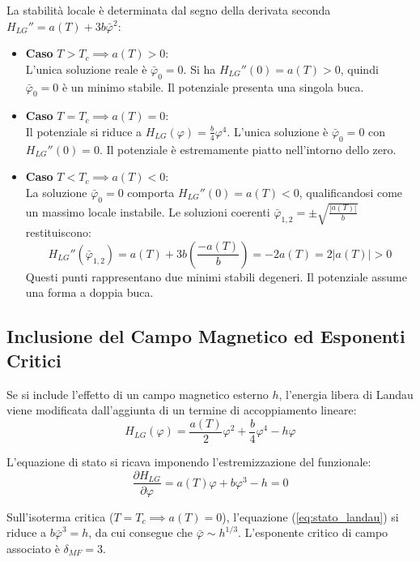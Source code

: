 La stabilità locale è determinata dal segno della derivata seconda $H_{LG}'' = a(T)+3b\bar{\varphi}^{2}$:
\begin{itemize}
    \item \textbf{Caso} $T>T_c \implies a(T)>0$:\\
    L'unica soluzione reale è $\bar{\varphi}_0=0$. Si ha $H_{LG}''(0)=a(T)>0$, quindi $\bar{\varphi}_0=0$ è un minimo stabile. Il potenziale presenta una singola buca.
    \item \textbf{Caso} $T=T_c \implies a(T)=0$:\\
    Il potenziale si riduce a $H_{LG}(\varphi) = \frac{b}{4}\varphi^4$. L'unica soluzione è $\bar{\varphi}_0=0$ con $H_{LG}''(0)=0$. Il potenziale è estremamente piatto nell'intorno dello zero.
    \item \textbf{Caso} $T<T_c \implies a(T)<0$:\\
    La soluzione $\bar{\varphi}_0=0$ comporta $H_{LG}''(0)=a(T)<0$, qualificandosi come un massimo locale instabile. Le soluzioni coerenti $\bar{\varphi}_{1,2}= \pm\sqrt{\frac{|a(T)|}{b}}$ restituiscono:
    \begin{equation}
    H_{LG}''(\bar{\varphi}_{1,2})=a(T)+3b\left(\frac{-a(T)}{b}\right)=-2a(T)=2|a(T)|>0
    \end{equation}
    Questi punti rappresentano due minimi stabili degeneri. Il potenziale assume una forma a doppia buca.
\end{itemize}

\subsection{Inclusione del Campo Magnetico ed Esponenti Critici}
Se si include l'effetto di un campo magnetico esterno $h$, l'energia libera di Landau viene modificata dall'aggiunta di un termine di accoppiamento lineare:
\begin{equation}
H_{LG}(\varphi) = \frac{a(T)}{2}\varphi^{2}+\frac{b}{4}\varphi^{4}-h\varphi
\end{equation}

L'equazione di stato si ricava imponendo l'estremizzazione del funzionale:
\begin{equation} 
\frac{\partial H_{LG}}{\partial\varphi}=a(T)\varphi+b\varphi^{3}-h=0 
\label{eq:stato_landau}
\end{equation}

Sull'isoterma critica ($T=T_c \implies a(T)=0$), l'equazione (\ref{eq:stato_landau}) si riduce a $b\bar{\varphi}^3=h$, da cui consegue che $\bar{\varphi} \sim h^{1/3}$. L'esponente critico di campo associato è $\delta_{MF}=3$.

